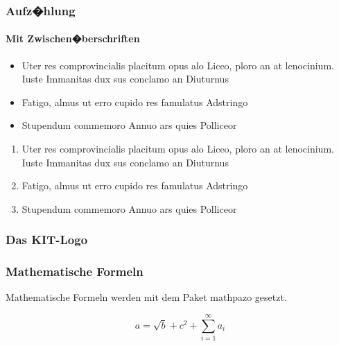 \documentclass[t]{beamer}
\newcommand{\itemsiii}{
  \item Uter res comprovincialis placitum opus alo Liceo, ploro an at lenocinium.
        Iuste Immanitas dux sus conclamo an Diuturnus
  \item Fatigo, almus ut erro cupido res famulatus Adstringo
  \item Stupendum commemoro Annuo ars quies Polliceor
}
\begin{document}
\begin{frame}
  \frametitle{Aufz�hlung}
  \framesubtitle{Mit Zwischen�berschriften}

  \begin{itemize}
  \itemsiii
  \end{itemize}
  \bigskip

  \begin{enumerate}
  \itemsiii
  \end{enumerate}
  \vfill
  \mbox{}
\end{frame}

\begin{frame}
  \frametitle{Das KIT-Logo}

  \hfill
  \bigskip

  \setlength{\vgdist}{.01\textwidth}
  \qquad
\end{frame}

\begin{frame}
  \frametitle{Mathematische Formeln}

  Mathematische Formeln werden mit dem Paket mathpazo gesetzt.

  \[a = \sqrt{b} + c^2 + \sum_{i=1}^\infty a_i\]
\end{frame}
\end{document}
